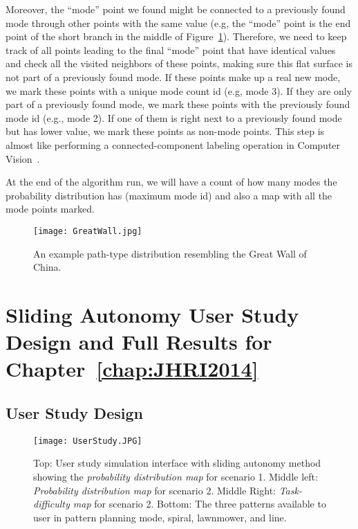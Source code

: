 \begin{enumerate}
Moreover, the ``mode'' point we found might be connected to a previously found mode through other points with the same value (e.g, the ``mode'' point is the end point of the short branch in the middle of Figure~\ref{GreatWall}). Therefore, we need to keep track of all points leading to the final ``mode'' point that have identical values and check all the visited neighbors of these points, making sure this flat surface is not part of a previously found mode. If these points make up a real new mode, we mark these points with a unique mode count id (e.g, mode 3). If they are only part of a previously found mode, we mark these points with the previously found mode id (e.g., mode 2). If one of them is right next to a previously found mode but has lower value, we mark these points as non-mode points. This step is almost like performing a connected-component labeling operation in Computer Vision~\cite{Sonka2007Image}.
\end{enumerate}

At the end of the algorithm run, we will have a count of how many modes the probability distribution has (maximum mode id) and also a map with all the mode points marked.

\begin{figure}
\centering
\texttt{[image: GreatWall.jpg]}
\caption{An example path-type distribution resembling the Great Wall of China.}
\label{GreatWall}
\end{figure}




\chapter{Sliding Autonomy User Study Design and Full Results for Chapter~\ref{chap:JHRI2014}}
\label{chap:SlidingAutonomy}

\section{User Study Design} 
\label{sec:ADesign}

\begin{figure}
\centering
\texttt{[image: UserStudy.JPG]}
\caption[Simulation interface and distribution and task-difficulty maps]{Top: User study simulation interface with sliding autonomy method showing the \textit{probability distribution map} for scenario 1. Middle left: \textit{Probability distribution map} for scenario 2. Middle Right: \textit{Task-difficulty map} for scenario 2. Bottom: The three patterns available to user in pattern planning mode, spiral, lawnmower, and line.}
\label{UserStudy2}
\end{figure}

